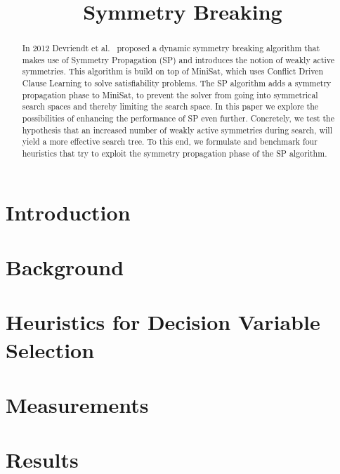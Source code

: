 

\title{Symmetry Breaking}


	\maketitle

	\begin{abstract}
	In 2012 Devriendt et al.~\cite{devriendt2012symmetry} proposed a dynamic symmetry breaking algorithm
	that makes use of Symmetry Propagation (SP) and introduces the notion of weakly active symmetries.
	This algorithm is build on top of MiniSat,
	which uses Conflict Driven Clause Learning to solve satisfiability problems. The SP algorithm adds a symmetry propagation phase to MiniSat,
	to prevent the solver from going into symmetrical search spaces and thereby limiting the search space.
	In this paper we explore the possibilities of enhancing the performance of SP even further.
	Concretely, we test the hypothesis that an increased number of weakly active symmetries during
	search, will yield a more effective search tree.
	To this end, we formulate and benchmark four heuristics that try to exploit the
	symmetry propagation phase of the SP algorithm.
	\end{abstract}

	\section{Introduction}
		\label{sec:Introduction}
		

	\section{Background}
		\label{sec:Background}
		

	\section{Heuristics for Decision Variable Selection}
		\label{sec:DecisionVars}
		

	\section{Measurements}
		\label{sec:measurements}
		

	\section{Results}
		\label{sec:Results}
		

